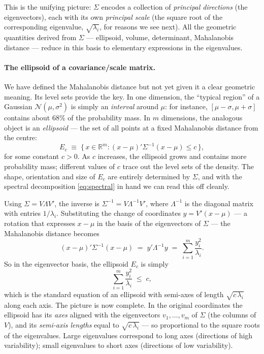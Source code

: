 \documentclass[11pt, a4paper, oneside]{article}
\begin{document}
This is the unifying picture: $\Sigma$ encodes a collection of
\emph{principal directions} (the eigenvectors), each with its own
\emph{principal scale} (the square root of the corresponding eigenvalue,
$\sqrt{\lambda_i}$, for reasons we see next). All the geometric
quantities derived from $\Sigma$ — ellipsoid, volume, determinant,
Mahalanobis distance — reduce in this basis to elementary expressions
in the eigenvalues.

\paragraph{The ellipsoid of a covariance/scale matrix.}
We have defined the Mahalanobis distance but not yet given it a clear
geometric meaning. Its level sets provide the key. In one dimension, the
``typical region'' of a Gaussian $\mathcal{N}(\mu, \sigma^{2})$ is simply
an \emph{interval} around $\mu$: for instance, $[\mu - \sigma, \mu + \sigma]$
contains about 68\% of the probability mass. In $m$ dimensions, the
analogous object is an \emph{ellipsoid} — the set of all points at a
fixed Mahalanobis distance from the centre:
\[
E_c \;\equiv\; \big\{\, x \in \mathbb{R}^{m} : (x-\mu)'\Sigma^{-1}(x-\mu) \leq c \,\big\},
\]
for some constant $c > 0$. As $c$ increases, the ellipsoid grows and
contains more probability mass; different values of $c$ trace out the
level sets of the density. The shape, orientation and size of $E_c$ are
entirely determined by $\Sigma$, and with the spectral decomposition
\eqref{eq:spectral} in hand we can read this off cleanly.

Using $\Sigma = V \Lambda V'$, the inverse is
$\Sigma^{-1} = V \Lambda^{-1} V'$, where $\Lambda^{-1}$ is the diagonal
matrix with entries $1/\lambda_i$. Substituting the change of coordinates
$y = V'(x - \mu)$ — a rotation that expresses $x - \mu$ in the basis of
the eigenvectors of $\Sigma$ — the Mahalanobis distance becomes
\[
(x - \mu)' \Sigma^{-1} (x - \mu) \;=\; y' \Lambda^{-1} y \;=\; \sum_{i=1}^{m} \frac{y_i^{2}}{\lambda_i}.
\]
So in the eigenvector basis, the ellipsoid $E_c$ is simply
\[
\sum_{i=1}^{m} \frac{y_i^{2}}{\lambda_i} \;\leq\; c,
\]
which is the standard equation of an ellipsoid with semi-axes of length
$\sqrt{c\, \lambda_i}$ along each axis. The picture is now complete. In
the original coordinates the ellipsoid has its \emph{axes} aligned with
the eigenvectors $v_1, \ldots, v_m$ of $\Sigma$ (the columns of $V$),
and its \emph{semi-axis lengths} equal to $\sqrt{c\, \lambda_i}$ — so
proportional to the square roots of the eigenvalues. Large eigenvalues
correspond to long axes (directions of high variability); small
eigenvalues to short axes (directions of low variability).
\end{document}
